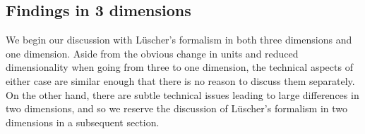\subsection{Findings in 3 dimensions}
We begin our discussion with L\"uscher's formalism in both three dimensions and one dimension.  Aside from the obvious change in units and reduced dimensionality when going from three to one dimension, the technical aspects of either case are similar enough that there is no reason to discuss them separately.  On the other hand, there are subtle technical issues leading to large differences in two dimensions, and so we reserve the discussion of L\"uscher's formalism in two dimensions in a subsequent section.



